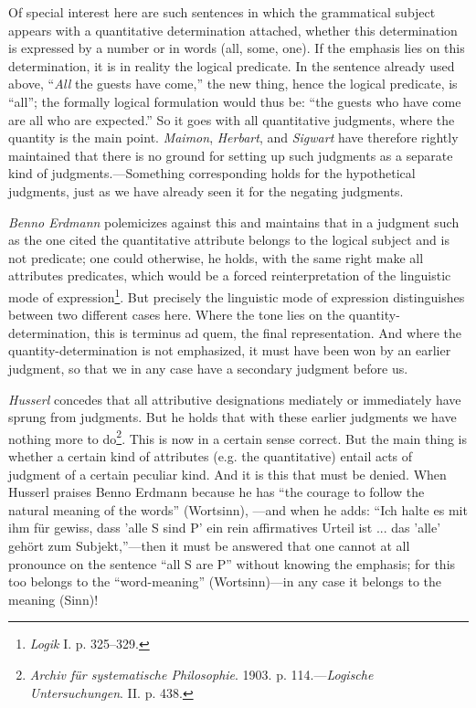 \documentclass[12pt,a4paper]{book}
\newcommand{\opage}[1]{\marginnote{\footnotesize\textit{[#1]}}}
\begin{document}
Of special interest here are such sentences in which the grammatical
subject appears with a quantitative determination attached, whether this
determination is expressed by a number or in words (all, some, one). If
the emphasis lies on this determination, it is in reality the logical
predicate. In the sentence already used above, ``\emph{All} the guests
have come,'' the new thing, hence the logical predicate, is ``all''; the
formally logical formulation would thus be: ``the guests who have come are
all who are expected.'' So it goes with all quantitative judgments, where
the quantity is the main point. \emph{Maimon}, \emph{Herbart}, and
\emph{Sigwart} have therefore rightly maintained that there is no ground
for setting up such judgments as a separate kind of judgments.---Something
corresponding holds for the hypothetical judgments, just as we have
already seen it for the negating judgments.

\emph{Benno Erdmann} polemicizes against this and maintains that in a
judgment such as the one cited the quantitative attribute belongs to \opage{90}the
logical subject and is not predicate; one could otherwise, he holds, with
the same right make all attributes predicates, which would be a forced
reinterpretation of the linguistic mode of expression\footnote{\emph{Logik}
I. p. 325--329.}. But precisely the linguistic mode of expression
distinguishes between two different cases here. Where the tone lies on the
quantity-determination, this is terminus ad quem, the final
representation. And where the quantity-determination is not emphasized, it
must have been won by an earlier judgment, so that we in any case have a
secondary judgment before us.

\emph{Husserl} concedes that all attributive designations mediately or
immediately have sprung from judgments. But he holds that with these
earlier judgments we have nothing more to do\footnote{\emph{Archiv für
systematische Philosophie}. 1903. p. 114.---\emph{Logische
Untersuchungen}. II. p. 438.}. This is now in a certain sense correct. But
the main thing is whether a certain kind of attributes (e.g. the
quantitative) entail acts of judgment of a certain peculiar kind. And it
is this that must be denied. When Husserl praises Benno Erdmann because he
has ``the courage to follow the natural meaning of the words'' (Wortsinn),
---and when he adds: ``Ich halte es mit ihm für gewiss, dass 'alle S sind
P' ein rein affirmatives Urteil ist ... das 'alle' gehört zum
Subjekt,''---then it must be answered that one cannot at all pronounce on
the sentence ``all S are P'' without knowing the emphasis; for this too
belongs to the ``word-meaning'' (Wortsinn)---in any case it belongs to the
meaning (Sinn)!
\end{document}
